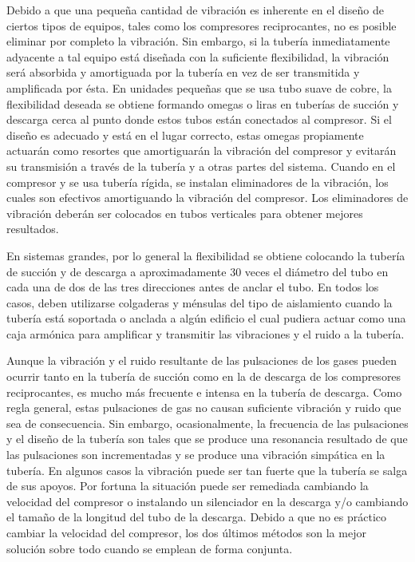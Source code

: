 	Debido a que una pequeña cantidad de vibración es inherente en el diseño de ciertos tipos de equipos, tales como los compresores reciprocantes, no es posible eliminar por completo la vibración. Sin embargo, si la tubería inmediatamente adyacente a tal equipo está diseñada con la suficiente flexibilidad, la vibración será absorbida y amortiguada por la tubería en vez de ser transmitida y amplificada por ésta. En unidades pequeñas que se usa tubo suave de cobre, la flexibilidad deseada se obtiene formando omegas o liras en tuberías de succión y descarga cerca al punto donde estos tubos están conectados al compresor. Si el diseño es adecuado y está en el lugar correcto, estas omegas propiamente actuarán como resortes que amortiguarán la vibración del compresor y evitarán su transmisión a través de la tubería y a otras partes del sistema. Cuando en el compresor y se usa tubería rígida, se instalan eliminadores de la vibración, los cuales son efectivos amortiguando la vibración del compresor. Los eliminadores de vibración deberán ser colocados en tubos verticales para obtener mejores resultados.

	En sistemas grandes, por lo general la flexibilidad se obtiene colocando la tubería de succión y de descarga a aproximadamente 30 veces el diámetro del tubo en cada una de dos de las tres direcciones antes de anclar el tubo. En todos los casos, deben utilizarse colgaderas y ménsulas del tipo de aislamiento cuando la tubería está soportada o anclada a algún edificio el cual pudiera actuar como una caja armónica para amplificar y transmitir las vibraciones y el ruido a la tubería.
	
	Aunque la vibración y el ruido resultante de las pulsaciones de los gases pueden ocurrir tanto en la tubería de succión como en la de descarga de los compresores reciprocantes, es mucho más frecuente e intensa en la tubería de descarga. Como regla general, estas pulsaciones de gas no causan suficiente vibración y ruido que sea de consecuencia. Sin embargo, ocasionalmente, la frecuencia de las pulsaciones y el diseño de la tubería son tales que se produce una resonancia resultado de que las pulsaciones son incrementadas y se produce una vibración simpática en la tubería. En algunos casos la vibración puede ser tan fuerte que la tubería se salga de sus apoyos. Por fortuna la situación puede ser remediada cambiando la velocidad del compresor o instalando un silenciador en la descarga y/o cambiando el tamaño de la longitud del tubo de la descarga. Debido a que no es práctico cambiar la velocidad del compresor, los dos últimos métodos son la mejor solución sobre todo cuando se emplean de forma conjunta.

